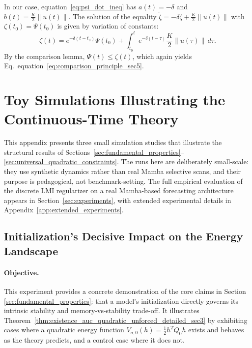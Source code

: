 \documentclass[10pt]{article} %
\def\eqref#1{equation~\ref{#1}}
\theoremstyle{definition}
\begin{document}
In our case, \eqref{eq:psi_dot_ineq} has $a(t)=-\delta$ and $b(t)=\frac{K}{2}\|u(t)\|$.
The solution of the equality $\dot{\zeta} = -\delta \zeta + \frac{K}{2}\|u(t)\|$ with $\zeta(t_0)=\Psi(t_0)$ is given by variation of constants:
\begin{equation}
\zeta(t) = e^{-\delta(t-t_0)}\Psi(t_0)
+ \int_{t_0}^t e^{-\delta(t-\tau)}\frac{K}{2}\|u(\tau)\|\,d\tau.
\end{equation}
By the comparison lemma, $\Psi(t)\le \zeta(t)$, which again yields Eq.~\eqref{eq:comparison_principle_sec5}.

\section{Toy Simulations Illustrating the Continuous-Time Theory}
\label{app:toy_simulations}

This appendix presents three small simulation studies that illustrate the structural results of Sections~\ref{sec:fundamental_properties}--\ref{sec:universal_quadratic_constraints}. The runs here are deliberately small-scale: they use synthetic dynamics rather than real Mamba selective scans, and their purpose is pedagogical, not benchmark-setting. The full empirical evaluation of the discrete LMI regularizer on a real Mamba-based forecasting architecture appears in Section~\ref{sec:experiments}, with extended experimental details in Appendix~\ref{app:extended_experiments}.

\subsection{Initialization's Decisive Impact on the Energy Landscape}
\label{subsec:sim_init_impact}

\paragraph{Objective.}
This experiment provides a concrete demonstration of the core claims in Section \ref{sec:fundamental_properties}: that a model's initialization directly governs its intrinsic stability and memory-vs-stability trade-off. It illustrates Theorem~\ref{thm:existence_auc_quadratic_unforced_detailed_sec3} by exhibiting cases where a quadratic energy function $V_{a,0}(h) = \frac{1}{2}h^T Q_0 h$ exists and behaves as the theory predicts, and a control case where it does not.
\end{document}
